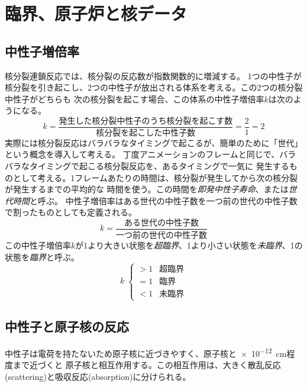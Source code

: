 \section{臨界、原子炉と核データ}

\subsection{中性子増倍率}
\label{subsec:multipilication_factor}
核分裂連鎖反応では、核分裂の反応数が指数関数的に増減する。
1つの中性子が核分裂を引き起こし、2つの中性子が放出される体系を考える。この2つの核分裂中性子がどちらも
次の核分裂を起こす場合、この体系の中性子増倍率$k$は次のようになる。
\begin{equation}
  k = \frac{\text{発生した核分裂中性子のうち核分裂を起こす数}}{\text{核分裂を起こした中性子数}} = \frac{2}{1} = 2
\end{equation}
実際には核分裂反応はバラバラなタイミングで起こるが、簡単のために「世代」という概念を導入して考える。
丁度アニメーションのフレームと同じで、バラバラなタイミングで起こる核分裂反応を、あるタイミングで一気に
発生するものとして考える。1フレームあたりの時間は、核分裂が発生してから次の核分裂が発生するまでの平均的な
時間を使う。この時間を\emph{即発中性子寿命}、または\emph{世代時間}と呼ぶ。
中性子増倍率はある世代の中性子数を一つ前の世代の中性子数で割ったものとしても定義される。
\begin{equation}
  \label{eq:multi_factor}
  k = \frac{\text{ある世代の中性子数}}{\text{一つ前の世代の中性子数}}
\end{equation}
この中性子増倍率$k$が1より大きい状態を\emph{超臨界}、1より小さい状態を\emph{未臨界}、1の状態を\emph{臨界}と呼ぶ。
\[
k \; \left\{
  \begin{array}{ll}
    > 1 & \text{超臨界} \\
    = 1 & \text{臨界} \\
    < 1 & \text{未臨界}
  \end{array}
\right.
\]

\subsection{中性子と原子核の反応}
中性子は電荷を持たないため原子核に近づきやすく、原子核と\SI{e-12}{\centi\metre}程度まで近づくと
原子核と相互作用する。この相互作用は、大きく散乱反応(scattering)と吸収反応(absorption)に分けられる。

